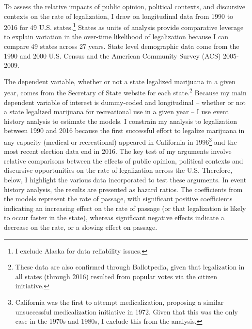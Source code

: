 To assess the relative impacts of public opinion, political contexts, and discursive contexts on the rate of legalization, I draw on longitudinal data from 1990 to 2016 for 49 U.S. states.\footnote{I exclude Alaska for data reliability issues.} %
States as units of analysis provide comparative leverage to explain variation in the over-time likelihood of legalization because I can compare 49 states across 27 years. %
State level demographic data come from the 1990 and 2000 U.S. Census and the American Community Survey (ACS) 2005-2009. %

The dependent variable, whether or not a state legalized marijuana in a given year, comes from the Secretary of State website for each state.\footnote{These data are also confirmed through Ballotpedia, given that legalization in all states (through 2016) resulted from popular votes via the citizen initiative.} Because my main dependent variable of interest is dummy-coded and longitudinal -- whether or not a state legalized marijuana for recreational use in a given year -- I use event history analysis to estimate the models. I constrain my analysis to legalization between 1990 and 2016 because the first successful effort to legalize marijuana in any capacity (medical or recreational) appeared in California in 1996\footnote{California was the first to attempt medicalization, proposing a similar unsuccessful medicalization initiative in 1972. Given that this was the only case in the 1970s and 1980s, I exclude this from the analysis.} and the most recent election data end in 2016. The key test of my arguments involve relative comparisons between the effects of public opinion, political contexts and discursive opportunities on the rate of legalization across the U.S. Therefore, below, I highlight the various data incorporated to test these arguments. In event history analysis, the results are presented as hazard ratios. The coefficients from the models represent the rate of passage, with significant positive coefficients indicating an increasing effect on the rate of passage (or that legalization is likely to occur faster in the state), whereas significant negative effects indicate a decrease on the rate, or a slowing effect on passage. 

